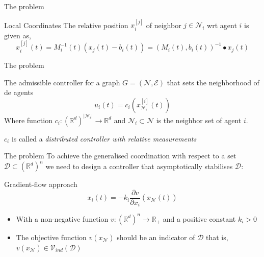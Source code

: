 \documentclass{beamer}
\begin{document}
\begin{frame}{The problem}
	\begin{block}{Local Coordinates}	
		The relative position $x^{[j]}_i$ of neighbor $j \in \mathcal{N}_i$ wrt agent $i$ is given as,
		\begin{equation*}
			x^{[j]}_i(t) = M_i^{-1}(t)(x_j(t)-b_i(t)) = (M_i(t),b_i(t))^{-1}\bullet x_j(t)
		\end{equation*}  
	\end{block}		
\end{frame}

\begin{frame}{The problem}
	\begin{block}{The admissible controller}	
		for a graph $G=(\mathcal{N},\mathcal{E})$ that sets the neighborhood of de agents 
		\begin{equation*}
			u_i(t) = c_i\left(x^{[i]}_{\mathcal{N}_i}(t)\right)
		\end{equation*}
		Where function $c_i:\left(\mathbb{R}^d\right)^{\vert \mathcal{N}_i \vert} \to \mathbb{R}^d$ and $\mathcal{N}_i \subset \mathcal{N}$ is the neighbor set of agent $i$.
	\end{block}
	
		$c_i$ is called a \emph{distributed controller with relative measurements}
			
\end{frame}

\begin{frame}{The problem}
	To achieve the generalised coordination with respect to a set $\mathcal{D} \subset \left(\mathbb{R}^d\right)^n$ we need to design a controller that asymptotically stabilises $\mathcal{D}$:
	\begin{block}{Gradient-flow approach}	
		\begin{equation*}
			x_i(t) = -k_i\frac{\partial v}{\partial x_i}\left(x_{\mathcal{N}}(t)\right)
		\end{equation*}
	\end{block}
	\begin{itemize}
		\item With a non-negative function $v:\left(\mathbb{R}^d\right)^n \to \mathbb{R}_+$ and a positive constant $k_i > 0$
		\item The objective function $v\left(x_{\mathcal{N}}\right)$ should be an indicator of $\mathcal{D}$ that is, $v\left(x_{\mathcal{N}}\right) \in \mathcal{V}_{ind}(\mathcal{D})$
	\end{itemize}
\end{frame}
\end{document}

